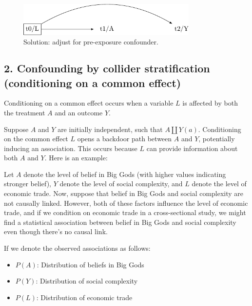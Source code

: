 \documentclass[
  singlecolumn]{report}
\providecommand{\tightlist}{%
  \setlength{\itemsep}{0pt}\setlength{\parskip}{0pt}}\usepackage{longtable,booktabs,array}
\begin{document}
\begin{figure}

{\centering \includegraphics[width=0.8\textwidth,height=\textheight]{causal-dags_files/figure-pdf/fig-dag-common-cause-solution-1.pdf}

}

\caption{\label{fig-dag-common-cause-solution}Solution: adjust for
pre-exposure confounder.}

\end{figure}

\hypertarget{confounding-by-collider-stratification-conditioning-on-a-common-effect}{%
\subsection{2. Confounding by collider stratification (conditioning on a
common
effect)}\label{confounding-by-collider-stratification-conditioning-on-a-common-effect}}

Conditioning on a common effect occurs when a variable \(L\) is affected
by both the treatment \(A\) and an outcome \(Y\).

Suppose \(A\) and \(Y\) are initially independent, such that
\(A \coprod Y(a)\). Conditioning on the common effect \(L\) opens a
backdoor path between \(A\) and \(Y\), potentially inducing an
association. This occurs because \(L\) can provide information about
both \(A\) and \(Y\). Here is an example:

Let \(A\) denote the level of belief in Big Gods (with higher values
indicating stronger belief), \(Y\) denote the level of social
complexity, and \(L\) denote the level of economic trade. Now, suppose
that belief in Big Gods and social complexity are not causally linked.
However, both of these factors influence the level of economic trade,
and if we condition on economic trade in a cross-sectional study, we
might find a statistical association between belief in Big Gods and
social complexity even though there's no causal link.

If we denote the observed associations as follows:

\begin{itemize}
\tightlist
\item
  \(P(A)\): Distribution of beliefs in Big Gods
\item
  \(P(Y)\): Distribution of social complexity
\item
  \(P(L)\): Distribution of economic trade
\end{itemize}
\end{document}
